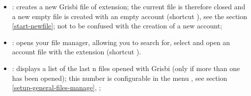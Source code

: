 \noindent
\begin{minipage}{.7\linewidth}
	\begin{itemize}[rightmargin=.6cm]
		\item {}: creates a new Grisbi file of \gls{extension}; the current file is therefore closed and a new empty file is created with an empty account (shortcut ), see the section \vref{start-newfile}; not to be confused with the creation of a new account;%
		\item {}: opens your file manager, allowing you to search for, select and open an account file with the  \gls{extension} (shortcut ).%
		\item {}: displays a list of the last n files opened with Grisbi (only if more than one has been opened); this number is configurable in the menu , see section \vref{setup-general-files-manage}, ;%
	\end{itemize}
\end{minipage}
\hspace{10pt}	
